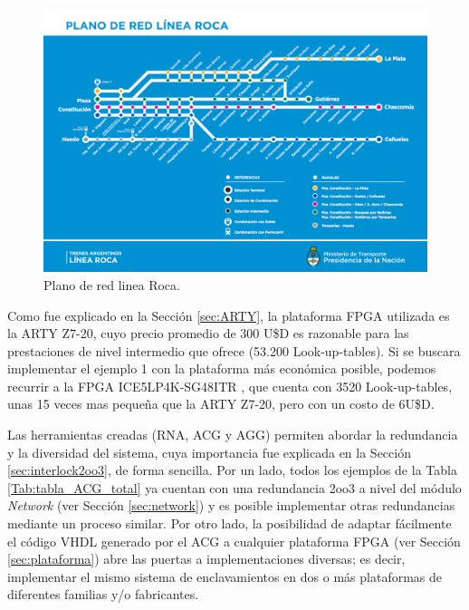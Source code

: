	 \begin{figure}[H]
	 	\centering
	 	\includegraphics[origin = c, width=1\textwidth]{resultados-obtenidos/ejemplo1/images/mapa-linea-roca}
	 	\centering\caption{Plano de red linea Roca.}
	 	\label{fig:ROCA}
	 \end{figure}
	 
	 Como fue explicado en la Sección \ref{sec:ARTY}, la plataforma FPGA utilizada es la ARTY Z7-20, cuyo precio promedio de 300 U\$D es razonable para las prestaciones de nivel intermedio que ofrece (53.200 Look-up-tables). Si se buscara implementar el ejemplo 1 con la plataforma más económica posible, podemos recurrir a la FPGA ICE5LP4K-SG48ITR \cite{LATTICE}, que cuenta con 3520 Look-up-tables, unas 15 veces mas pequeña que la ARTY Z7-20, pero con un costo de 6U\$D.
	 
	 
	 Las herramientas creadas (RNA, ACG y AGG) permiten abordar la redundancia y la diversidad del sistema, cuya importancia fue explicada en la Sección \ref{sec:interlock2oo3}, de forma sencilla. Por un lado, todos los ejemplos de la Tabla \ref{Tab:tabla_ACG_total} ya cuentan con una redundancia 2oo3 a nivel del módulo \textit{Network} (ver Sección \ref{sec:network}) y es posible implementar otras redundancias mediante un proceso similar. Por otro lado, la posibilidad de adaptar fácilmente el código VHDL generado por el ACG a cualquier plataforma FPGA (ver Sección \ref{sec:plataforma}) abre las puertas a implementaciones diversas; es decir, implementar el mismo sistema de enclavamientos en dos o más plataformas de diferentes familias y/o fabricantes.
	 
	 
	 
	 
	 
	 
	 
	